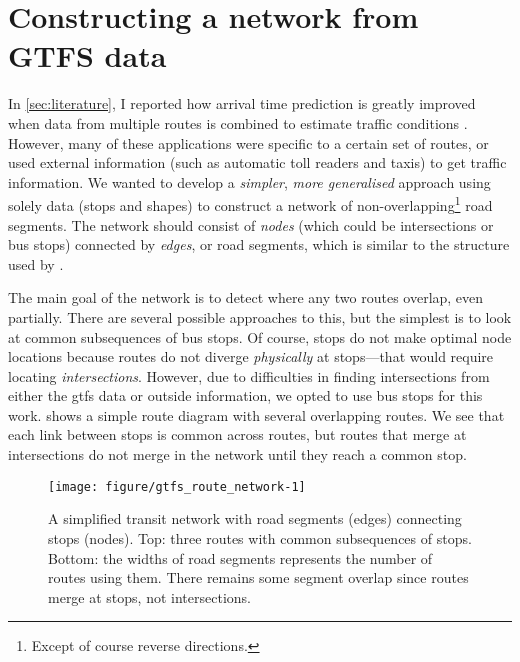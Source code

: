 

\section{Constructing a network from GTFS data}
\label{sec:route-segments}

In \cref{sec:literature}, I reported how arrival time prediction is greatly improved when data from multiple routes is combined to estimate traffic conditions \citep{Yu_2011}. However, many of these applications were specific to a certain set of routes, or used external information (such as automatic toll readers and taxis) to get \rt{} traffic information. We wanted to develop a \emph{simpler}, \emph{more generalised} approach using solely \GTFS{} data (stops and shapes) to construct a network of non-overlapping\footnote{Except of course reverse directions.} road segments. The network should consist of \emph{nodes} (which could be intersections or bus stops) connected by \emph{edges}, or road segments, which is similar to the structure used by \citet{Celan_2017,Vuurstaek_2018}.


The main goal of the network is to detect where any two routes overlap, even partially. There are several possible approaches to this, but the simplest is to look at common subsequences of bus stops. Of course, stops do not make optimal node locations because routes do not diverge \emph{physically} at stops---that would require locating \emph{intersections}. However, due to difficulties in finding intersections from either the \gls{gtfs} data or outside information, we opted to use bus stops for this work.  shows a simple route diagram with several overlapping routes. We see that each link between stops is common across routes, but routes that merge at intersections do not merge in the network until they reach a common stop.


\begin{knitrout}\small
{}\color{fgcolor}\begin{figure}

{\centering \texttt{[image: figure/gtfs\_route\_network-1]} 

}

\caption[A simplified transit network with road segments (edges) connecting stops (nodes)]{A simplified transit network with road segments (edges) connecting stops (nodes). Top: three routes with common subsequences of stops. Bottom: the widths of road segments represents the number of routes using them. There remains some segment overlap since routes merge at stops, not intersections.}\label{fig:gtfs_route_network}
\end{figure}


\end{knitrout}





